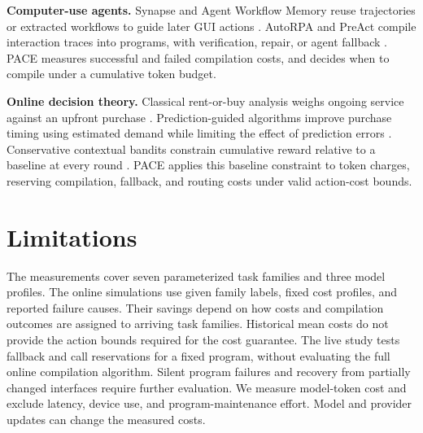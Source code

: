 \textbf{Computer-use agents.}
Synapse and Agent Workflow Memory reuse trajectories or extracted workflows to guide later GUI actions \citep{zheng2024synapse,wang2025awm}.
AutoRPA and PreAct compile interaction traces into programs, with verification, repair, or agent fallback \citep{chen2026autorpa,li2026preact}.
PACE measures successful and failed compilation costs, and decides when to compile under a cumulative token budget.

\textbf{Online decision theory.}
Classical rent-or-buy analysis weighs ongoing service against an upfront purchase \citep{karlin1994competitive}.
Prediction-guided algorithms improve purchase timing using estimated demand while limiting the effect of prediction errors \citep{purohit2018improving,gollapudi2019online}.
Conservative contextual bandits constrain cumulative reward relative to a baseline at every round \citep{kazerouni2016conservative}.
PACE applies this baseline constraint to token charges, reserving compilation, fallback, and routing costs under valid action-cost bounds.

\section{Limitations}
\label{sec:limitations}

The measurements cover seven parameterized task families and three model profiles.
The online simulations use given family labels, fixed cost profiles, and reported failure causes.
Their savings depend on how costs and compilation outcomes are assigned to arriving task families.
Historical mean costs do not provide the action bounds required for the cost guarantee.
The live study tests fallback and call reservations for a fixed program, without evaluating the full online compilation algorithm.
Silent program failures and recovery from partially changed interfaces require further evaluation.
We measure model-token cost and exclude latency, device use, and program-maintenance effort.
Model and provider updates can change the measured costs.


\FloatBarrier
\label{main:text-end}




\clearpage
\appendix
\raggedbottom
{}

